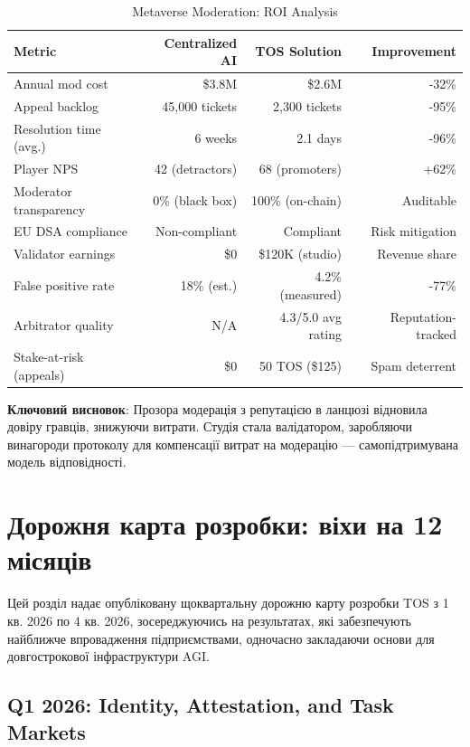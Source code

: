 \documentclass[11pt]{article}
\begin{document}
\begin{table}[H]
\centering
\caption{Metaverse Moderation: ROI Analysis}
\label{tab:metaverse-roi}
\begin{tabular}{@{}lrrr@{}}
\toprule
\textbf{Metric} & \textbf{Centralized AI} & \textbf{TOS Solution} & \textbf{Improvement} \\ \midrule
Annual mod cost & \$3.8M & \$2.6M & -32\% \\
Appeal backlog & 45,000 tickets & 2,300 tickets & -95\% \\
Resolution time (avg.) & 6 weeks & 2.1 days & -96\% \\
Player NPS & 42 (detractors) & 68 (promoters) & +62\% \\
Moderator transparency & 0\% (black box) & 100\% (on-chain) & Auditable \\
EU DSA compliance & Non-compliant & Compliant & Risk mitigation \\
Validator earnings & \$0 & \$120K (studio) & Revenue share \\
False positive rate & 18\% (est.) & 4.2\% (measured) & -77\% \\
Arbitrator quality & N/A & 4.3/5.0 avg rating & Reputation-tracked \\
Stake-at-risk (appeals) & \$0 & 50 TOS (\$125) & Spam deterrent \\
\bottomrule
\end{tabular}
\end{table}

\textbf{Ключовий висновок}: Прозора модерація з репутацією в ланцюзі відновила довіру гравців, знижуючи витрати. Студія стала валідатором, заробляючи винагороди протоколу для компенсації витрат на модерацію — самопідтримувана модель відповідності.

\section{Дорожня карта розробки: віхи на 12 місяців}
\label{sec:12month-roadmap}

Цей розділ надає опубліковану щоквартальну дорожню карту розробки TOS з 1 кв. 2026 по 4 кв. 2026, зосереджуючись на результатах, які забезпечують найближче впровадження підприємствами, одночасно закладаючи основи для довгострокової інфраструктури AGI.

\subsection{Q1 2026: Identity, Attestation, and Task Markets}
\end{document}
